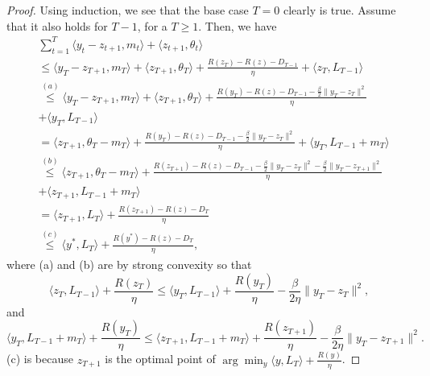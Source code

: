 \documentclass[pmlr]{jmlr} %
\begin{document}
\begin{proof}
Using induction, we see that 
the base case $T=0$ clearly is true.
Assume that it also holds for $T-1$, for a $T \geq 1$.
Then, we have
\begin{equation}
\begin{aligned}
& \sum_{t=1}^{T}  \langle y_{t} - z_{t+1} , m_{t} \rangle + \langle z_{t+1} , \theta_{t} \rangle
\\& \leq \langle y_{T} - z_{T+1}, m_{T} \rangle + \langle z_{T+1}, \theta_{T} \rangle
+ \frac{ R(z_{T}) - R(z) - D_{T-1} }{\eta} + \langle z_{T}, L_{T-1} \rangle
\\& \overset{(a)}{\leq}
\langle y_{T} - z_{T+1}, m_{T} \rangle + \langle z_{T+1}, \theta_{T} \rangle
+ \frac{ R(y_{T}) - R(z) - D_{T-1} - \frac{\beta}{2} \| y_{T} - z_{T} \|^{2} }{\eta} 
\\ & + \langle y_{T}, L_{T-1} \rangle
\\& = \langle z_{T+1}, \theta_{T} - m_{T} \rangle 
+ \frac{ R(y_{T}) - R(z) - D_{T-1} - \frac{\beta}{2} \| y_{T} - z_{T} \|^{2} }{\eta} + \langle y_{T}, L_{T-1} + m_{T} \rangle
\\& \overset{(b)}{\leq}  \langle z_{T+1}, \theta_{T} - m_{T} \rangle 
+ \frac{ R(z_{T+1})- R(z) - D_{T-1} - \frac{\beta}{2} \| y_{T} - z_{T} \|^{2} 
- \frac{\beta}{2} \| y_{T} - z_{T+1} \|^{2}
}{\eta}
\\&  + \langle z_{T+1}, L_{T-1} + m_{T} \rangle
\\& = \langle z_{T+1}, L_{T} \rangle 
+ \frac{  R(z_{T+1})- R(z) - D_{T} }{\eta}
\\ & \overset{(c)}{\leq} 
\langle y^{*}, L_{T} \rangle 
+ \frac{  R(y^{*}) - R(z) - D_{T} }{\eta},
\end{aligned}
\end{equation}
where (a) and (b) are by strong convexity so that
\begin{equation}
\langle z_{T}, L_{T-1} \rangle + \frac{R(z_{T})}{\eta}
\leq \langle y_{T}, L_{T-1} \rangle + \frac{R(y_{T})}{\eta} - \frac{\beta}{2 \eta} \| y_{T} - z_{T}  \|^{2},
\end{equation}
and
\begin{equation}
\langle y_{T}, L_{T-1} + m_{T} \rangle + \frac{R(y_{T})}{\eta}
\leq \langle z_{T+1}, L_{T-1} + m_{T} \rangle + \frac{R(z_{T+1})}{\eta} - \frac{\beta}{2 \eta} \| y_{T} - z_{T+1}  \|^{2}.
\end{equation}
(c) is because $z_{T+1}$ is the optimal point of 
$\arg\min_{y} \langle y , L_{T} \rangle + \frac{R(y)}{\eta}$.


\end{proof}
\end{document}
